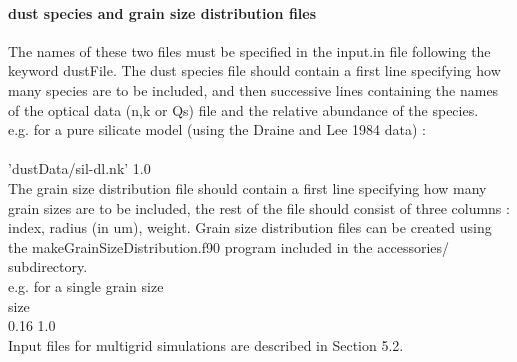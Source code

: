 \documentclass[11pt]{article}
\begin{document}
\paragraph{     dust species and grain size distribution files }
    The names of these two files must be specified in the input.in file following
    the keyword dustFile. 
    The dust species file should contain a first line specifying how many species are 
    to be included, and then successive lines containing the names of the optical data (n,k or Qs) 
    file and the relative abundance of the species. \\    
\noindent    e.g. for a pure silicate model (using the Draine and Lee 1984 data) :\\
\\
\noindent       'dustData/sil-dl.nk' 1.0\\
    The grain size distribution file should contain a first 
    line specifying how many grain sizes are to be included, the rest of the file
    should consist of three columns : index, radius (in um), weight. Grain size 
    distribution files can be created using the makeGrainSizeDistribution.f90 
    program included in the accessories/ subdirectory. \\
\noindent e.g. for a single grain size \\
 size\\
 0.16 1.0\\

    Input files for multigrid simulations are described in Section 5.2. \\
\end{document}
